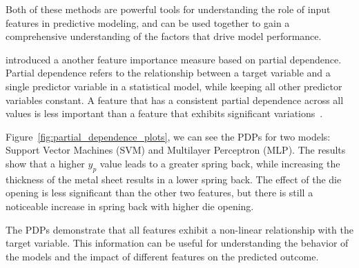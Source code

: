 Both of these methods are powerful tools for understanding the role of input features in
predictive modeling, and can be used together to gain a comprehensive understanding of the
factors that drive model performance.

\cite{greenwell2018simple} introduced a another feature importance measure based on partial
dependence.
Partial dependence refers to the relationship between a target variable and a single predictor
variable in a statistical model, while keeping all other predictor variables constant.
A feature that has a consistent partial dependence across all values is less important than a
feature that exhibits significant variations~\cite[p. 117--118]{molnar2020interpretable}.


Figure~\ref{fig:partial_dependence_plots}, we can see the PDPs for two models: Support Vector
Machines (SVM) and Multilayer Perceptron (MLP).
The results show that a higher \(y_p\) value leads to a greater spring back, while increasing the
thickness of the metal sheet results in a lower spring back.
The effect of the die opening is less significant than the other two features, but there is still
a noticeable increase in spring
back with higher die opening.

The PDPs demonstrate that all features exhibit a non-linear relationship with the target variable.
This information can be useful for understanding the behavior of the models and the impact of
different features on the predicted outcome.


